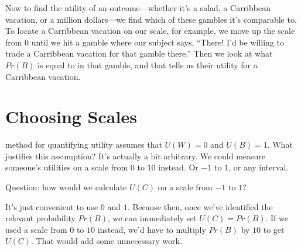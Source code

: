 \documentclass[justified]{tufte-book}
\renewcommand{\u}{U}
\newcommand{\p}{Pr}
\theoremstyle{definition}
\theoremstyle{definition}
\theoremstyle{definition}
\theoremstyle{remark}
\begin{document}
Now to find the utility of an outcome---whether it's a salad, a Carribbean vacation, or a million dollars---we find which of these gambles it's comparable to. To locate a Carribbean vacation on our scale, for example, we move up the scale from 0 until we hit a gamble where our subject says, ``There! I'd be willing to trade a Carribbean vacation for that gamble there.'' Then we look at what \(\p(B)\) is equal to in that gamble, and that tells us their utility for a Carribbean vacation.

\hypertarget{choosing-scales}{%
\section{Choosing Scales}\label{choosing-scales}}

 method for quantifying utility assumes that \(\u(W) = 0\) and \(\u(B) = 1\). What justifies this assumption? It's actually a bit arbitrary. We could measure someone's utilities on a scale from \(0\) to \(10\) instead. Or \(-1\) to \(1\), or any interval.

\begin{marginfigure}
Question: how would we calculate \(\u(C)\) on a scale from \(-1\) to
\(1\)?
\end{marginfigure}

It's just convenient to use \(0\) and \(1\). Because then, once we've identified the relevant probability \(\p(B)\), we can immediately set \(\u(C) = \p(B)\). If we used a scale from \(0\) to \(10\) instead, we'd have to multiply \(\p(B)\) by \(10\) to get \(\u(C)\). That would add some unnecessary work.
\end{document}
